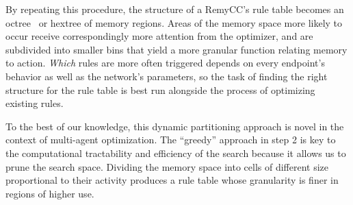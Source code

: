 By repeating this procedure, the structure of a RemyCC's rule table
becomes an octree~\cite{octree} or hextree of memory regions. Areas of
the memory space more likely to occur receive correspondingly more
attention from the optimizer, and are subdivided into smaller bins
that yield a more granular function relating memory to
action. \emph{Which} rules are more often triggered depends on every
endpoint's behavior as well as the network's parameters, so the task
of finding the right structure for the rule table is best run
alongside the process of optimizing existing rules.

To the best of our knowledge, this dynamic partitioning approach is
novel in the context of multi-agent optimization. The ``greedy''
approach in step 2 is key to the computational tractability and
efficiency of the search because it allows us to prune the search
space. Dividing the memory space into cells of different size
proportional to their activity produces a rule table
whose granularity is finer in regions of higher use.

